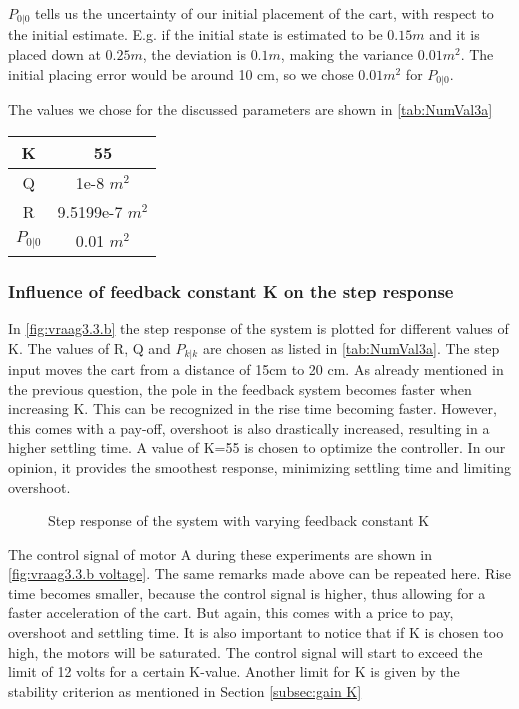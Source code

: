 \documentclass[a4paper]{article}
\newcommand{\newpar}{\vspace{.3cm}\noindent}
\begin{document}
\newpar
$P_{0|0}$ tells us the uncertainty of our initial placement of the cart, with respect to the initial estimate. E.g. if the initial state is estimated to be $0.15m$ and it is placed down at $0.25m$, the deviation is $0.1m$, making the variance $0.01m^2$. The initial placing error would be around 10 cm, so we chose $0.01m^2$ for $P_{0|0}$.

\newpar
The values we chose for the discussed parameters are shown in \autoref{tab:NumVal3a}

\begin{center}
    \begin{tabular}{|c|c|}
        \hline
         K & 55 \\
        \hline
         Q & 1e-8 $m^2$ \\
        \hline
         R & 9.5199e-7 $m^2$ \\
        \hline
         $P_{0|0}$ & 0.01 $m^2$ \\
        \hline
    \end{tabular}
    \label{tab:NumVal3a}
\end{center}

\subsubsection{Influence of feedback constant K on the step response}
In \autoref{fig:vraag3.3.b} the step response of the system is plotted for different values of K. The values of R, Q and $P_{k|k}$ are chosen as listed in \autoref{tab:NumVal3a}. The step input moves the cart from a distance of 15cm to 20 cm. As already mentioned in the previous question, the pole in the feedback system becomes faster when increasing K. This can be recognized in the rise time becoming faster. However, this comes with a pay-off, overshoot is also drastically increased, resulting in a higher settling time. A value of K=55 is chosen to optimize the controller. In our opinion, it provides the smoothest response, minimizing settling time and limiting overshoot.

\begin{figure}[H]
    \caption{Step response of the system with varying feedback constant K}
    \label{fig:vraag3.3.b}
\end{figure}

The control signal of motor A during these experiments are shown in \autoref{fig:vraag3.3.b voltage}. The same remarks made above can be repeated here. Rise time becomes smaller, because the control signal is higher, thus allowing for a faster acceleration of the cart. But again, this comes with a price to pay, overshoot and settling time. It is also important to notice that if K is chosen too high, the motors will be saturated. The control signal will start to exceed the limit of 12 volts for a certain K-value. Another limit for K is given by the stability criterion as mentioned in Section \ref{subsec:gain K}
\end{document}
